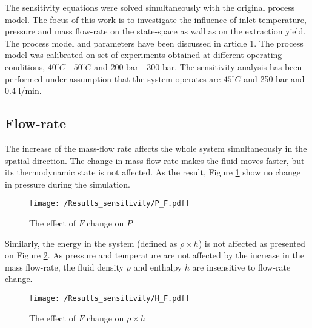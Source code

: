 \documentclass[../Article_Model_Parameters.tex]{subfiles}
\begin{document}
	
	\label{CH: Results}
	
	The sensitivity equations were solved simultaneously with the original process model. The focus of this work is to investigate the influence of inlet temperature, pressure and mass flow-rate on the state-space as wall as on the extraction yield. The process model and parameters have been discussed in {\color{red}article 1}. The process model was calibrated on set of experiments obtained at different operating conditions, $40^\circ C$ - $50^\circ C$ and 200 bar - 300 bar. The sensitivity analysis has been performed under assumption that the system operates are $45^\circ C$ and 250 bar and 0.4 l/min.
	
	\subsection{Flow-rate}
	
	The increase of the mass-flow rate affects the whole system simultaneously in the spatial direction. The change in mass flow-rate makes the fluid moves faster, but its thermodynamic state is not affected. As the result, Figure \ref{fig:Sensitivty_F_P} show no change in pressure during the simulation. 
    
    \begin{figure}[h!]
    	\centering
    	\texttt{[image: /Results\_sensitivity/P\_F.pdf]}
    	\caption{The effect of $F$ change on $P$}
    	\label{fig:Sensitivty_F_P}
    \end{figure}
    
    Similarly, the energy in the system (defined as $\rho \times h$) is not affected as presented on Figure \ref{fig:Sensitivty_F_H}. As pressure and temperature are not affected by the increase in the mass flow-rate, the fluid density $\rho$ and enthalpy $h$ are insensitive to flow-rate change.
    
    \begin{figure}[h!]
    	\centering
    	\texttt{[image: /Results\_sensitivity/H\_F.pdf]}
    	\caption{The effect of $F$ change on $\rho \times h$}
    	\label{fig:Sensitivty_F_H}
    \end{figure}
    
\end{document}
